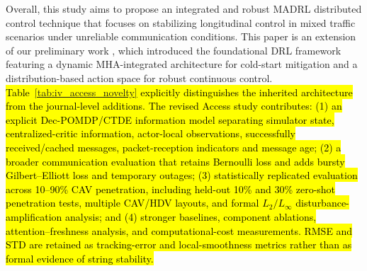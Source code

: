 \documentclass{ieeeaccess}
\begin{document}
Overall, this study aims to propose an integrated and robust MADRL distributed control technique that focuses on stabilizing longitudinal control in mixed traffic scenarios under unreliable communication conditions. This paper is an extension of our preliminary work \cite{cai2026integrating}, which introduced the foundational DRL framework featuring a dynamic MHA-integrated architecture for cold-start mitigation and a distribution-based action space for robust continuous control. \hl{Table~\ref{tab:iv_access_novelty} explicitly distinguishes the inherited architecture from the journal-level additions. The revised Access study contributes: (1) an explicit Dec-POMDP/CTDE information model separating simulator state, centralized-critic information, actor-local observations, successfully received/cached messages, packet-reception indicators and message age; (2) a broader communication evaluation that retains Bernoulli loss and adds bursty Gilbert--Elliott loss and temporary outages; (3) statistically replicated evaluation across 10--90\% CAV penetration, including held-out 10\% and 30\% zero-shot penetration tests, multiple CAV/HDV layouts, and formal $L_2/L_\infty$ disturbance-amplification analysis; and (4) stronger baselines, component ablations, attention--freshness analysis, and computational-cost measurements. RMSE and STD are retained as tracking-error and local-smoothness metrics rather than as formal evidence of string stability.}
\end{document}
